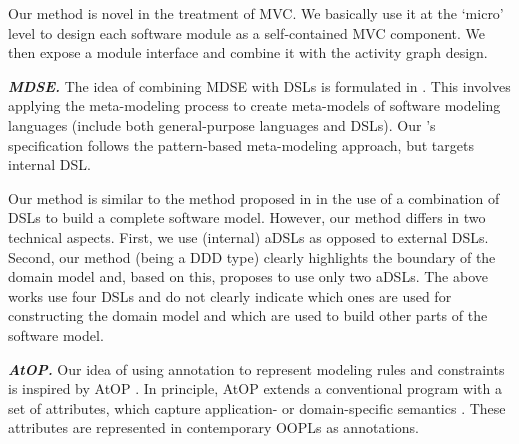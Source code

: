 Our method is novel in the treatment of MVC. We basically use it at the `micro' level to design each software module as a self-contained MVC component. We then expose a module interface and combine it with the activity graph design.

\textbf{\textit{MDSE.}}
The idea of combining MDSE with DSLs is formulated in \cite{kleppe_software_2008, brambilla_model-driven_2012}. This involves applying the meta-modeling process to create meta-models of software modeling languages (include both general-purpose languages and DSLs). 
Our \agl's specification follows the pattern-based meta-modeling approach, but targets internal DSL.

Our method is similar to the method proposed in \cite{warmer_model_2007, warmer_building_2006} in the use of a combination of DSLs to build a complete software model. 
%
However, our method differs in two technical aspects. 
First, we use (internal) aDSLs as opposed to external DSLs. Second, our method (being a DDD type) clearly highlights the boundary of the domain model and, based on this, proposes to use only two aDSLs. The above works use four DSLs and do not clearly indicate which ones are used for constructing the domain model and which are used to build other parts of the software model. 

\textbf{\textit{AtOP.}}
Our idea of using annotation to represent modeling rules and constraints is inspired by AtOP \cite{wada_modeling_2005, cepa_representing_2005,sulir_recording_2016,balz_embedding_2012}. In principle, AtOP extends a conventional program with a set of attributes, which capture application- or domain-specific semantics \cite{cepa_representing_2005}. These attributes are represented in contemporary OOPLs as annotations. 

